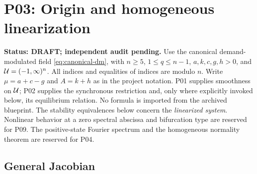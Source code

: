 
\section{P03: Origin and homogeneous linearization}
\label{sec:P03}
\noindent\textbf{Status: DRAFT; independent audit pending.}
Use the canonical demand-modulated field \eqref{eq:canonical-dm},
with $n\ge5$, $1\le q\le n-1$, $a,k,c,g,h>0$, and
$\mathcal{U}=(-1,\infty)^n$. All indices and equalities of indices are
modulo $n$. Write $\mu=a+c-g$ and $A=k+h$ as in the project notation.
P01 supplies smoothness on $\mathcal{U}$; P02 supplies the synchronous
restriction and, only where explicitly invoked below, its equilibrium
relation. No formula is imported from the archived blueprint.
The stability equivalences below concern the \emph{linearized system}.
Nonlinear behavior at a zero spectral abscissa and bifurcation type
are reserved for P09. The positive-state Fourier spectrum and the
homogeneous normality theorem are reserved for P04.

\subsection{General Jacobian}

